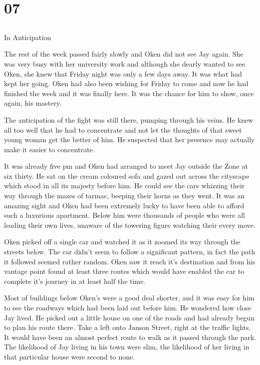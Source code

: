 \chapter{07}
\section{}
In Anticipation  

The rest of the week passed fairly slowly and Oken did not see Jay again.  She was very busy with her university work and although she dearly wanted to see Oken, she knew that Friday night was only a few days away.  It was what had kept her going.  Oken had also been wishing for Friday to come and now he had finished the week and it was finally here.  It was the chance for him to show, once again, his mastery.

The anticipation of the fight was still there, pumping through his veins.  He knew all too well that he had to concentrate and not let the thoughts of that sweet young woman get the better of him.  He suspected that her presence may actually make it easier to concentrate.  

It was already five pm and Oken had arranged to meet Jay outside the Zone at six thirty.  He sat on the cream coloured sofa and gazed out across the cityscape which stood in all its majesty before him.  He could see the cars whizzing their way through the mazes of tarmac, beeping their horns as they went.  It was an amazing sight and Oken had been extremely lucky to have been able to afford such a luxurious apartment.  Below him were thousands of people who were all leading their own lives, unaware of the towering figure watching their every move.  

Oken picked off a single car and watched it as it zoomed its way through the streets below.  The car didn't seem to follow a significant pattern, in fact the path it followed seemed rather random.  Oken saw it reach it's destination and from his vantage point found at least three routes which would have enabled the car to complete it's journey in at least half the time.

Most of buildings below Oken's were a good deal shorter, and it was easy for him to see the roadways which had been laid out before him.  He wondered how close Jay lived.  He picked out a little house on one of the roads and had already begun to plan his route there.  Take a left onto Janson Street, right at the traffic lights.  It would have been an almost perfect route to walk as it passed through the park.  The likelihood of Jay living in his town were slim, the likelihood of her living in that particular house were second to none.


